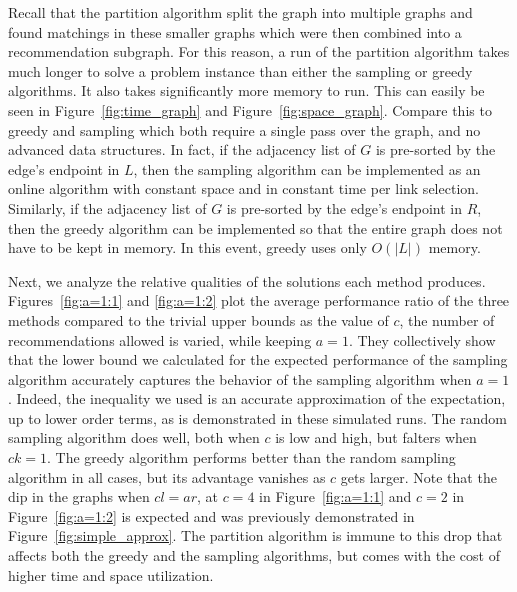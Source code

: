Recall that the partition algorithm split the graph into multiple graphs
and found matchings in these smaller graphs which were then combined into
a recommendation subgraph. For this reason, a run of the partition
algorithm takes much longer to solve a problem instance than either the
sampling or greedy algorithms. It also takes significantly more memory to
run. This can easily be seen in Figure~\ref{fig:time_graph} and Figure~\ref{fig:space_graph}.
Compare this to greedy and sampling which both require a single pass over
the graph, and no advanced data structures. In fact, if the adjacency list
of $G$ is pre-sorted by the edge's endpoint in $L$, then the sampling algorithm can be
implemented as an online algorithm with constant space and in constant time 
per link selection. Similarly, if the adjacency list of $G$
is pre-sorted by the edge's endpoint in $R$, then the greedy algorithm can
be implemented so that the entire graph does not have to be kept in memory. In this
event, greedy uses only $O(|L|)$ memory.\vs

Next, we analyze the relative qualities of the solutions each method
produces.  Figures~\ref{fig:a=1:1} and \ref{fig:a=1:2} plot the
average performance ratio of the three methods compared to the trivial
upper bounds as the value of $c$, the number of recommendations
allowed is varied, while keeping $a = 1$.
They collectively show that the lower bound we calculated for the
expected performance of the sampling algorithm accurately captures the
behavior of the sampling algorithm when $a=1$. Indeed, the inequality
we used is an accurate approximation of the expectation, up to lower
order terms, as is demonstrated in these simulated runs.  The random
sampling algorithm does well, both when $c$ is low and high, but
falters when $ck=1$. The greedy algorithm performs better than the
random sampling algorithm in all cases, but its advantage vanishes as
$c$ gets larger. Note that the dip in the graphs when $cl=ar$, at
$c=4$ in Figure~\ref{fig:a=1:1} and $c=2$ in Figure~\ref{fig:a=1:2} is
expected and was previously demonstrated in
Figure~\ref{fig:simple_approx}.  The partition algorithm is immune to
this drop that affects both the greedy and the sampling algorithms,
but comes with the cost of higher time and space utilization.

